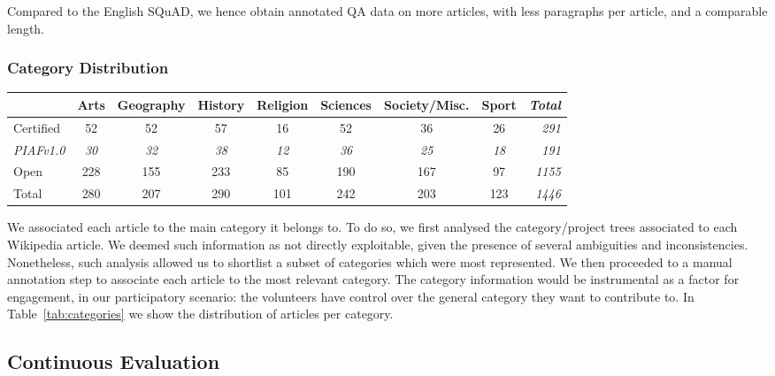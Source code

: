 \documentclass[10pt, a4paper]{article}
\begin{document}
Compared to the English SQuAD, we hence obtain annotated QA data on more articles, with less paragraphs per article, and a comparable length.


\subsubsection*{Category Distribution}

\begin{table*}
\begin{center}
\begin{tabular}{lcccccccr}&\textbf{Arts}&\textbf{Geography}&\textbf{History}&\textbf{Religion}&\textbf{Sciences}&\textbf{Society/Misc.}&\textbf{Sport}&\emph{Total}\\
      \hline
      Certified & 52 & 52& 57& 16 & 52 & 36 & 26&\emph{291}\\
      \emph{\hphantom{.1pt}PIAFv1.0} & \emph{30} & \emph{32} & \emph{38} & \emph{12} & \emph{36} & \emph{25} & \emph{18} &\emph{191}\\
      Open & 228 & 155& 233& 85 & 190 & 167 & 97&\emph{1155}\\
      \hline
      Total & 280 & 207& 290& 101 & 242 & 203 & 123&\emph{1446}\\
      \hline

\end{tabular}
\caption{Category distribution of source articles in \emph{Certified} (a subset of which is released as \emph{PIAFv1.0}) and \emph{Open} splits.}
\label{tab:categories}
\end{center}
\end{table*}
We associated each article to the main category it belongs to. To do so, we first analysed the category/project trees associated to each Wikipedia article. We deemed such information as not directly exploitable, given the presence of several ambiguities and inconsistencies. Nonetheless, such analysis allowed us to shortlist a subset of categories which were most represented. We then proceeded to a manual annotation step to associate each article to the most relevant category. The category information would be instrumental as a factor for engagement, in our participatory scenario: the volunteers have control over the general category they want to contribute to. In Table~\ref{tab:categories} we show the distribution of articles per category.


\subsection*{Continuous Evaluation}
\end{document}
